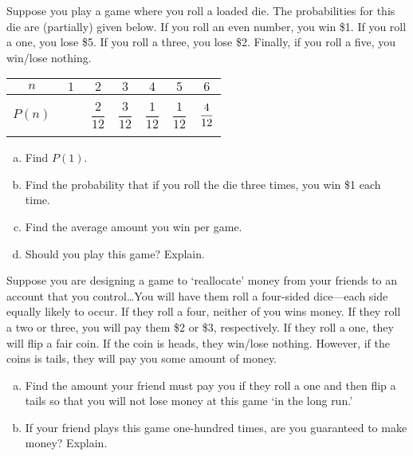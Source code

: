 \documentclass[11pt,letterpaper]{article}
\begin{document}

 Suppose you play a game where you roll a loaded die. The probabilities for this die are (partially) given below. If you roll an even number, you win \$1. If you roll a one, you lose \$5. If you roll a three, you lose \$2. Finally, if you roll a five, you win/lose nothing. 
	\begin{table}[!ht]
	\centering 
	\begin{tabular}{|c||c|c|c|c|c|c|} \hline 
	$n$ & $1$ & $2$ & $3$ & $4$ & $5$ & $6$ \\ \hline 
	$P(n)$ & $\phantom{\dfrac{00}{00}}$ & $\dfrac{2}{12}$ & $\dfrac{3}{12}$ & $\dfrac{1}{12}$ & $\dfrac{1}{12}$ & $\dfrac{4\rule{0pt}{2.9ex}}{12\rule[-1.3ex]{0pt}{0pt}}$ \\ \hline
	\end{tabular}
	\end{table}

\begin{enumerate}[(a)]
\item Find $P(1)$. 
\item Find the probability that if you roll the die three times, you win \$1 each time. 
\item Find the average amount you win per game. 
\item Should you play this game? Explain.
\end{enumerate}



\newpage



 Suppose you are designing a game to `reallocate' money from your friends to an account that you control\dots You will have them roll a four-sided dice---each side equally likely to occur. If they roll a four, neither of you wins money. If they roll a two or three, you will pay them \$2 or \$3, respectively. If they roll a one, they will flip a fair coin. If the coin is heads, they win/lose nothing. However, if the coins is tails, they will pay you some amount of money. 
	\begin{enumerate}[(a)]
	\item Find the amount your friend must pay you if they roll a one and then flip a tails so that you will not lose money at this game `in the long run.' 
	\item If your friend plays this game one-hundred times, are you guaranteed to make money? Explain. 
	\end{enumerate}
\end{document}
